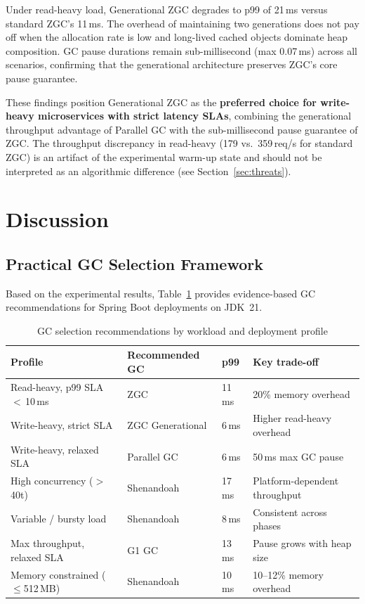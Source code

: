 Under read-heavy load, Generational ZGC degrades to p99 of 21\,ms versus standard ZGC's 11\,ms. The overhead of maintaining two generations does not pay off when the allocation rate is low and long-lived cached objects dominate heap composition. GC pause durations remain sub-millisecond (max 0.07\,ms) across all scenarios, confirming that the generational architecture preserves ZGC's core pause guarantee.

These findings position Generational ZGC as the \textbf{preferred choice for write-heavy microservices with strict latency SLAs}, combining the generational throughput advantage of Parallel GC with the sub-millisecond pause guarantee of ZGC. The throughput discrepancy in read-heavy (179 vs.\ 359\,req/s for standard ZGC) is an artifact of the experimental warm-up state and should not be interpreted as an algorithmic difference (see Section~\ref{sec:threats}).

\section{Discussion}
\label{sec:discussion}

\subsection{Practical GC Selection Framework}
\label{subsec:recommendations}

Based on the experimental results, Table~\ref{tab:recommendations} provides evidence-based GC recommendations for Spring Boot deployments on JDK~21.

\begin{table}[htbp]
\centering
\caption{GC selection recommendations by workload and deployment profile}
\label{tab:recommendations}
\begin{tabular}{p{4cm}p{3.2cm}p{1.8cm}p{3.5cm}}
\hline
\textbf{Profile} & \textbf{Recommended GC} & \textbf{p99} & \textbf{Key trade-off} \\
\hline
Read-heavy, p99 SLA $<$\,10\,ms   & ZGC              & 11\,ms & 20\% memory overhead \\
Write-heavy, strict SLA            & ZGC Generational &  6\,ms & Higher read-heavy overhead \\
Write-heavy, relaxed SLA           & Parallel GC      &  6\,ms & 50\,ms max GC pause \\
High concurrency ($>$\,40t)        & Shenandoah       & 17\,ms & Platform-dependent throughput \\
Variable / bursty load             & Shenandoah       &  8\,ms & Consistent across phases \\
Max throughput, relaxed SLA        & G1 GC            & 13\,ms & Pause grows with heap size \\
Memory constrained ($\leq$512\,MB) & Shenandoah       & 10\,ms & 10--12\% memory overhead \\
\hline
\end{tabular}
\end{table}

